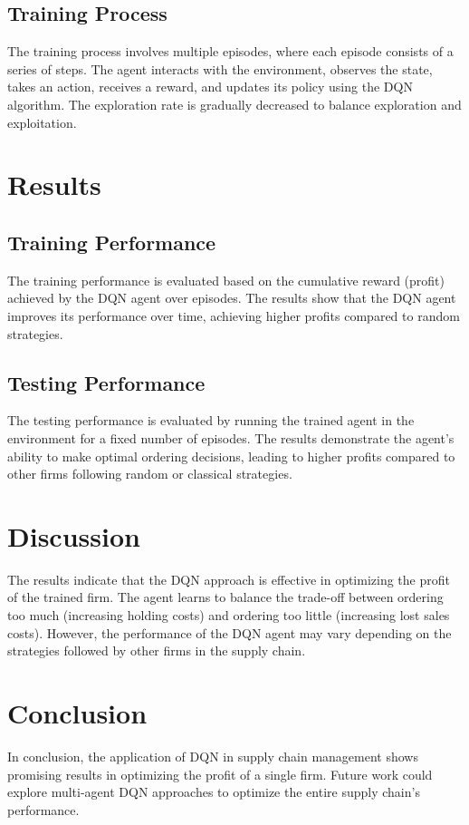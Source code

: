 \documentclass[nohyperref]{article}
\theoremstyle{plain}
\theoremstyle{definition}
\theoremstyle{remark}
\begin{document}
    \subsection{Training Process}
    The training process involves multiple episodes, where each episode consists of a series of steps. The agent interacts with the environment, observes the state, takes an action, receives a reward, and updates its policy using the DQN algorithm. The exploration rate is gradually decreased to balance exploration and exploitation.
    
    \section{Results}
    \subsection{Training Performance}
    The training performance is evaluated based on the cumulative reward (profit) achieved by the DQN agent over episodes. The results show that the DQN agent improves its performance over time, achieving higher profits compared to random strategies.
    
    \subsection{Testing Performance}
    The testing performance is evaluated by running the trained agent in the environment for a fixed number of episodes. The results demonstrate the agent's ability to make optimal ordering decisions, leading to higher profits compared to other firms following random or classical strategies.
    
    \section{Discussion}
    The results indicate that the DQN approach is effective in optimizing the profit of the trained firm. The agent learns to balance the trade-off between ordering too much (increasing holding costs) and ordering too little (increasing lost sales costs). However, the performance of the DQN agent may vary depending on the strategies followed by other firms in the supply chain.
    
    \section{Conclusion}
    In conclusion, the application of DQN in supply chain management shows promising results in optimizing the profit of a single firm. Future work could explore multi-agent DQN approaches to optimize the entire supply chain's performance.
    
\end{document}
